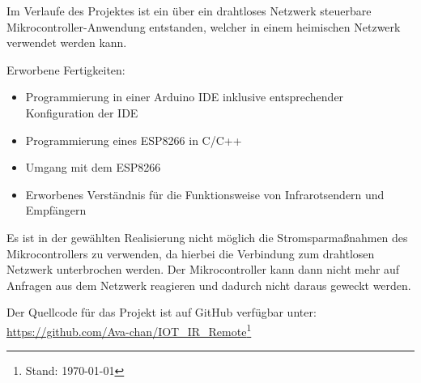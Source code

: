 Im Verlaufe des Projektes ist ein über ein drahtloses Netzwerk steuerbare Mikrocontroller-Anwendung entstanden, welcher in einem heimischen Netzwerk verwendet werden kann.

Erworbene Fertigkeiten:
\begin{itemize}
	\item Programmierung in einer Arduino \acs{IDE} inklusive entsprechender Konfiguration der \acs{IDE}
	\item Programmierung eines ESP8266 in C/C++
	\item Umgang mit dem ESP8266
	\item Erworbenes Verständnis für die Funktionsweise von Infrarotsendern und Empfängern
\end{itemize} 

Es ist in der gewählten Realisierung nicht möglich die Stromsparmaßnahmen des Mikrocontrollers zu verwenden, da hierbei die Verbindung zum drahtlosen Netzwerk unterbrochen werden. Der Mikrocontroller kann dann nicht mehr auf Anfragen aus dem Netzwerk reagieren und dadurch nicht daraus geweckt werden.

Der Quellcode für das Projekt ist auf GitHub verfügbar unter:\\ \url{https://github.com/Ava-chan/IOT_IR_Remote}\footnote{Stand: \today}

\pagebreak

